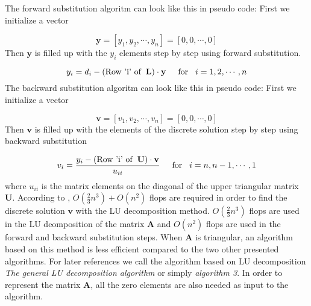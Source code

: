 \documentclass[11pt]{article}
\begin{document}
\vspace{4mm}
\noindent
The forward substitution algoritm can look like
this in pseudo code: First we initialize a vector

\begin{equation*}
\mathbf{y} = [y_1,y_2, \cdots, y_n] = [0, 0, \cdots, 0]
\end{equation*}
Then $\mathbf{y}$ is filled up with the $y_i$ elements step by step using forward substitution.

\begin{equation*} 
y_i = d_i - (\text{Row 'i' of} \hspace{0.2cm}\mathbf{L})\cdot\mathbf{y}
\hspace{0.5cm} \text{for} \hspace{0.3cm} i = 1, 2, \cdots, n 
\end{equation*}
The backward substitution algoritm can look like
this in pseudo code: First we initialize a vector

\begin{equation*}
\mathbf{v} = [v_1,v_2, \cdots, v_n] = [0, 0, \cdots, 0]
\end{equation*}
Then $\mathbf{v}$ is filled up with the elements of the discrete solution step by step using 
backward substitution

\begin{equation*} 
v_i = \frac{y_i - (\text{Row 'i' of} \hspace{0.2cm}\mathbf{U})\cdot\mathbf{v}}{u_{ii}}
\hspace{0.5cm} \text{for} \hspace{0.3cm} i = n, n-1, \cdots, 1 
\end{equation*}
where $u_{ii}$ is the matrix elements on the diagonal of the upper triangular matrix 
$\mathbf U$. According to \cite{mhh}, $O(\frac{2}{3}n^3) + O(n^2)$ flops are required
in order to find the discrete solution $\mathbf{v}$ with the LU decomposition method. 
$O(\frac{2}{3}n^3)$ flops are used in the LU deomposition of the matrix $\mathbf A$ and
$O(n^2)$ flops are used in the forward and backward substitution steps. When $\mathbf A$
is triangular, an algorithm based on this method is less efficient
compared to the two other presented algorithms. For later references we call the algorithm
based on LU decomposition 
\emph{The general LU decomposition algorithm} or simply \emph{algorithm 3}. In order
to represent the matrix $\mathbf A$, all the zero elements are also needed as input
to the algorithm.
\end{document}
